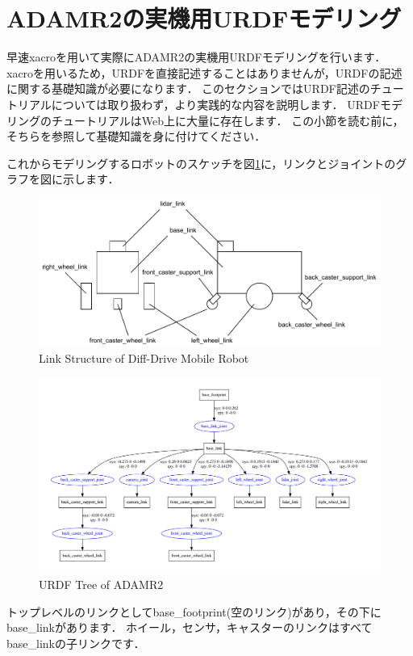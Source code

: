 \documentclass[{../../master}]{subfiles}
\begin{document}
\section{ADAMR2の実機用URDFモデリング}

早速\textsf{xacro}を用いて実際にADAMR2の実機用URDFモデリングを行います．
\textsf{xacro}を用いるため，URDFを直接記述することはありませんが，URDFの記述に関する基礎知識が必要になります．
このセクションではURDF記述のチュートリアルについては取り扱わず，より実践的な内容を説明します．
URDFモデリングのチュートリアルはWeb上に大量に存在します．
この小節を読む前に，そちらを参照して基礎知識を身に付けてください．

これからモデリングするロボットのスケッチを図\ref{fig:mobile_robot_structure}に，リンクとジョイントのグラフを図に示します．

\begin{figure}[ht]
  \centering
  \includegraphics[width=100truemm, clip]{images/mobile_robot_structure.pdf}
  \caption{Link Structure of Diff-Drive Mobile Robot}
  \label{fig:mobile_robot_structure}
\end{figure}

\begin{figure}[ht]
  \centering
  \includegraphics[width=100truemm, clip]{images/adamr2_urdf_tree.pdf}
  \caption{URDF Tree of ADAMR2}
  \label{fig:adamr2_urdf_tree}
\end{figure}

トップレベルのリンクとして\textsf{base\_footprint}(空のリンク)があり，その下に\textsf{base\_link}があります．
ホイール，センサ，キャスターのリンクはすべて\textsf{base\_link}の子リンクです．
\end{document}
